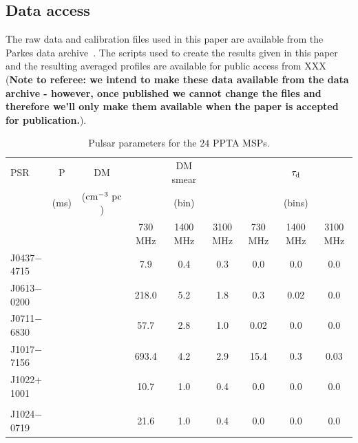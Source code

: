 \documentclass[useAMS,usenatbib]{mn2e}
\begin{document}
\subsection{Data access}

The raw data and calibration files used in this paper are available from the 
Parkes data archive~\citep[][data.csiro.au]{Hobbs11}.  
%
The scripts used to create the results given in this paper and the resulting averaged 
profiles are available for public access from XXX ({\bf Note to referee: we intend 
to make these data available from the data archive - however, once published we cannot 
change the files and therefore we’ll only make them available when the paper is accepted 
for publication.}). 

\begin{table}
\caption{Pulsar parameters for the $24$ PPTA MSPs.}
\label{psr}
\begin{center}
\begin{tabular}{lcccccccc}
\hline
PSR         &   P     &       DM          &          &  DM smear &             &          &   $\tau_{\rm{d}}$ &           \\
            &  (ms)   &  ($\rm{cm^{-3}\ pc}$)  &          &   (bin)   &             &          &     (bins)        &           \\
			      &         &                   &  730 MHz & 1400 MHz  & 3100 MHz    & 730 MHz  &     1400 MHz      & 3100 MHz  \\
\hline
J0437$-$4715&         &                   & 7.9      & 0.4       & 0.3         &  0.0     &  0.0              &  0.0     \\
J0613$-$0200&         &                   & 218.0    & 5.2       & 1.8         &  0.3     &  0.02             &  0.0      \\
J0711$-$6830&         &                   & 57.7     & 2.8       & 1.0         &  0.02    &  0.0              &  0.0     \\
J1017$-$7156&         &                   & 693.4    & 4.2       & 2.9         &  15.4    &  0.3              &  0.03    \\
J1022$+$1001&         &                   & 10.7     & 1.0       & 0.4         &  0.0     &  0.0              &  0.0      \\
            &         &                   &          &           &             &          &                   &           \\
J1024$-$0719&         &                   & 21.6     & 1.0       & 0.4         &  0.0     &  0.0              &  0.0      \\

\end{tabular}
\end{center}
\end{table}
\end{document}
